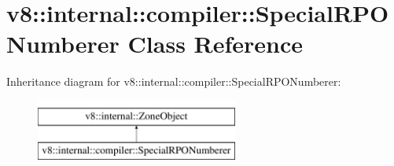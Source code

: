 \hypertarget{classv8_1_1internal_1_1compiler_1_1SpecialRPONumberer}{}\section{v8\+:\+:internal\+:\+:compiler\+:\+:Special\+R\+P\+O\+Numberer Class Reference}
\label{classv8_1_1internal_1_1compiler_1_1SpecialRPONumberer}
Inheritance diagram for v8\+:\+:internal\+:\+:compiler\+:\+:Special\+R\+P\+O\+Numberer\+:\begin{figure}[H]
\begin{center}
\leavevmode
\includegraphics[height=2.000000cm]{classv8_1_1internal_1_1compiler_1_1SpecialRPONumberer}
\end{center}
\end{figure}
